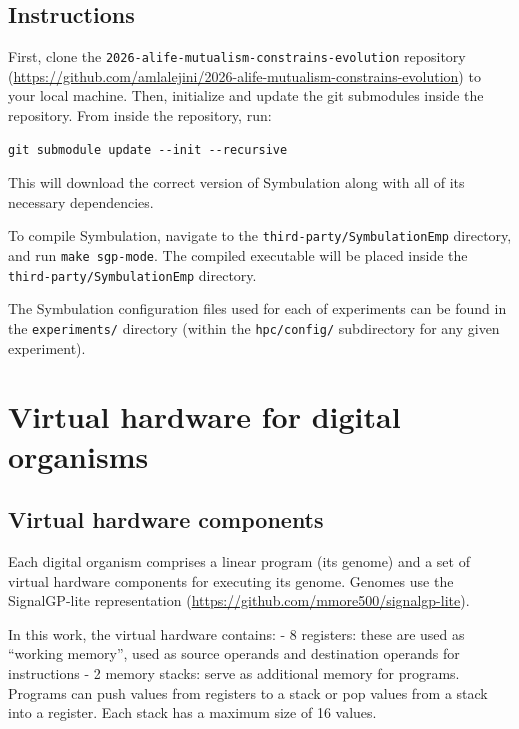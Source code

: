 \documentclass[
]{book}
\begin{document}
\hypertarget{instructions}{%
\section{Instructions}\label{instructions}}

First, clone the \texttt{2026-alife-mutualism-constrains-evolution} repository (\url{https://github.com/amlalejini/2026-alife-mutualism-constrains-evolution}) to your local machine.
Then, initialize and update the git submodules inside the repository.
From inside the repository, run:

\begin{verbatim}
git submodule update --init --recursive
\end{verbatim}

This will download the correct version of Symbulation along with all of its necessary dependencies.

To compile Symbulation, navigate to the \texttt{third-party/SymbulationEmp} directory, and run \texttt{make\ sgp-mode}.
The compiled executable will be placed inside the \texttt{third-party/SymbulationEmp} directory.

The Symbulation configuration files used for each of experiments can be found in the \texttt{experiments/} directory (within the \texttt{hpc/config/} subdirectory for any given experiment).

\hypertarget{virtual-hardware-for-digital-organisms}{%
\chapter{Virtual hardware for digital organisms}\label{virtual-hardware-for-digital-organisms}}

\hypertarget{virtual-hardware-components}{%
\section{Virtual hardware components}\label{virtual-hardware-components}}

Each digital organism comprises a linear program (its genome) and a set of virtual hardware components for executing its genome.
Genomes use the SignalGP-lite representation (\url{https://github.com/mmore500/signalgp-lite}).

In this work, the virtual hardware contains:
- 8 registers: these are used as ``working memory'', used as source operands and destination operands for instructions
- 2 memory stacks: serve as additional memory for programs. Programs can push values from registers to a stack or pop values from a stack into a register. Each stack has a maximum size of 16 values.
\end{document}
